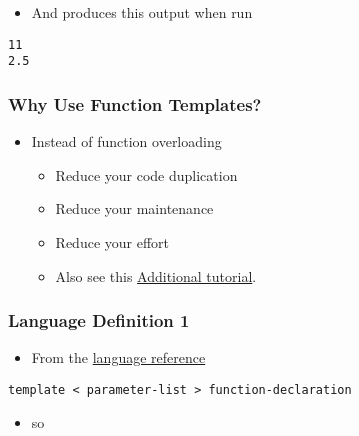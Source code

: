 \begin{itemize}
\itemsep1pt\parskip0pt
\item
  And produces this output when run
\end{itemize}

\begin{verbatim}
11
2.5
\end{verbatim}

\subsubsection{Why Use Function
Templates?}\label{why-use-function-templates}

\begin{itemize}
\itemsep1pt\parskip0pt
\item
  Instead of function overloading

  \begin{itemize}
  \itemsep1pt\parskip0pt
  \item
    Reduce your code duplication
  \item
    Reduce your maintenance
  \item
    Reduce your effort
  \item
    Also see this
    \href{http://www.codeproject.com/Articles/257589/An-Idiots-Guide-to-Cplusplus-Templates-Part}{Additional
    tutorial}.
  \end{itemize}
\end{itemize}

\subsubsection{Language Definition 1}\label{language-definition-1}

\begin{itemize}
\itemsep1pt\parskip0pt
\item
  From the
  \href{http://en.cppreference.com/w/cpp/language/function_template}{language
  reference}
\end{itemize}

\begin{verbatim}
template < parameter-list > function-declaration
\end{verbatim}

\begin{itemize}
\itemsep1pt\parskip0pt
\item
  so
\end{itemize}

